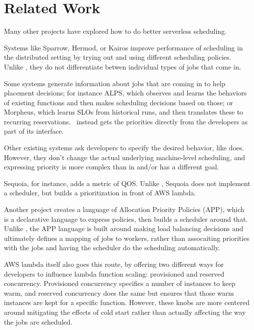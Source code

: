 \section{Related Work}

Many other projects have explored how to do better serverless scheduling.
 
Systems like Sparrow\cite{TODO}, Hermod\cite{TODO}, or Kairos\cite{TODO} improve
performance of scheduling in the distributed setting by trying out and using
different scheduling policies. Unlike \sys{}, they do not differentiate betwen
individual types of jobs that come in.


Some systems generate information about jobs that are coming in to help
placement decisions; for instance ALPS\cite{TODO}, which observes and learns the
behaviors of existing functions and then makes scheduling decisions based on
those; or Morpheus\cite{TODO}, which learns SLOs from historical runs, and then
translates these to recurring reservations.\ \sys{} instead gets the priorities
directly from the developers as part of its interface.


Other existing systems ask developers to specify the desired behavior, like
\sys{} does. However, they don't change the actual underlying machine-level
scheduling, and expressing priority is more complex than in \sys{} and/or
has a different goal.

Sequoia\cite{TODO}, for instance, adds a metric of QOS. Unlike \sys{}, Sequoia
does not implement a scheduler, but builds a prioritization in front of AWS
lambda. 

Another project\cite{TODO} creates a language of Allocation Priority Policies
(APP), which is a declarative language to express policies, then builds a
scheduler around that. Unlike \sys{}, the APP language is built around making
load balancing decisions and ultimately defines a mapping of jobs to workers,
rather than assocaiting priorities with the jobs and having the scheduler do the
scheduling automatically.

AWS lambda itself also goes this route, by offering two different ways for
developers to influence lambda function scaling: provisioned and reserved
concurrency. Provisioned concurrency specifies a number of instances to keep
warm, and reserved concurrency does the same but ensures that those warm
instances are kept for a specific function. However, these knobs are more
centered around mitigating the effects of cold start rather than actually
affecting the way the  jobs are scheduled.
